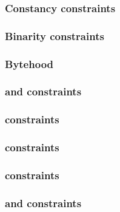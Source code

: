 \subsubsection{Constancy constraints}                                                           \label{rom: generalities: constancies}                  
\subsubsection{Binarity constraints}                                                            \label{rom: generalities: binarities}                   
\subsubsection{Bytehood}                                                                        \label{rom: generalities: bytehood}                     
\subsubsection{\flagSum{} and \weightedFlagSum{} constraints}                                   \label{rom: generalities: flag sum constraints}         
\subsubsection{\romColumnCfiMax{} constraints}                                                  \label{rom: generalities: cfi max constraints}          
\subsubsection{\romColumnCfi{} constraints}                                                              \label{rom: generalities: cfi constraints}              
\subsubsection{\done{} constraints}                                                             \label{rom: generalities: done constraints}             
\subsubsection{\romColumnEmptyCode{} and \romColumnNonemptyCode{} constraints}                  \label{rom: generalities: empty and nonempty code}      
